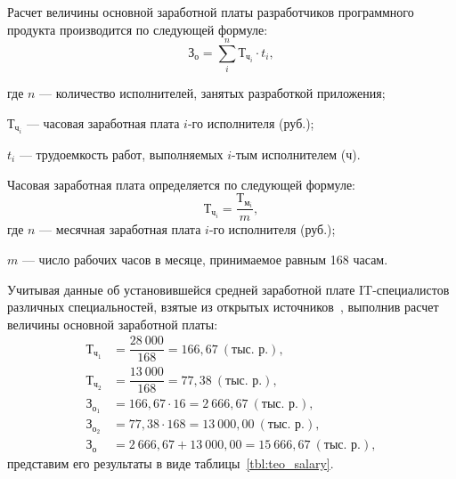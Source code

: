 Расчет величины основной заработной платы разработчиков программного
продукта производится по следующей формуле:
\begin{equation}
  \text{З}_{\text{о}} =
  \sum^n_i \text{Т}_{\text{ч}_{i}} \cdot t_{i},
\end{equation}

\noindent где
\( n \)
--- количество исполнителей, занятых разработкой приложения; \par
\noindent \hspace{6.5mm} \( \text{Т}_{\text{ч}_{i}} \)
--- часовая заработная плата \( i \)-го исполнителя (руб.); \par
\noindent \hspace{6.5mm} \( t_i \)
--- трудоемкость работ, выполняемых \( i \)-тым исполнителем (ч).

Часовая заработная плата определяется по следующей формуле:
\begin{equation}
  \text{Т}_{\text{ч}_{i}} =
  \dfrac{\text{Т}_{\text{м}_{i}}}{m},
\end{equation}
\noindent где
\( n \)
--- месячная заработная плата \( i \)-го исполнителя (руб.); \par
\noindent \hspace{6.2mm} \( m \)
--- число рабочих часов в месяце, принимаемое равным 168 часам.

Учитывая данные об установившейся средней заработной
плате IT-специалистов различных специальностей,
взятые из открытых источников~\cite{dev_by_salaries},
выполнив расчет величины основной заработной платы:
\begin{equation}
  \label{eq:teo_salary}
  \begin{aligned}
    \text{Т}_{\text{ч}_{1}}& = \dfrac{28 \: 000}{168} = 166{,}67 \: (\text{тыс. р.}), \\[1mm]
    \text{Т}_{\text{ч}_{2}}& = \dfrac{13 \: 000}{168} = 77{,}38 \: (\text{тыс. р.}), \\[1mm]
    \text{З}_{\text{о}_1}& = 166{,}67 \cdot 16 = 2 \: 666{,}67 \: (\text{тыс. р.}), \\
    \text{З}_{\text{о}_2}& = 77{,}38 \cdot 168 = 13 \: 000{,}00 \: (\text{тыс. р.}), \\
    \text{З}_{\text{о}}& = 2 \: 666{,}67 + 13 \: 000{,}00 = 15 \: 666{,}67 \: (\text{тыс. р.}),
  \end{aligned}
\end{equation}
представим его результаты в виде таблицы~\ref{tbl:teo_salary}.

